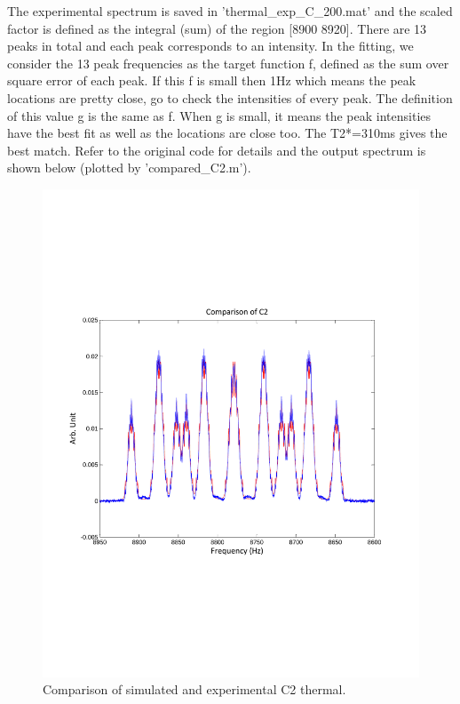 \documentclass[prl,onecolumn]{revtex4-1}
\begin{document}
The experimental spectrum is saved in 'thermal\_exp\_C\_200.mat' and the scaled factor is defined as the integral (sum) of the region [8900 8920]. There are 13 peaks in total and each peak corresponds to an intensity. In the fitting, we consider the 13 peak frequencies as the target function f, defined as the sum over square error of each peak. If this f is small then 1Hz which means the peak locations are pretty close, go to check the intensities of every peak. The definition of this value g is the same as f. When g is small, it means the peak intensities have the best fit as well as the locations are close too. The T2*=310ms gives the best match. Refer to the original code for details and the output spectrum is shown below (plotted by 'compared\_C2.m').

\begin{figure}
\begin{minipage}[hbtp]{0.5\linewidth}
\centering
\includegraphics[width=0.8\columnwidth]{comparison_C2.pdf}
\caption{Comparison of simulated and experimental C2 thermal.}
\label{fig:side:a}
\end{minipage}%
\begin{minipage}[hbtp]{0.5\linewidth}
\centering

\end{minipage}
\end{figure}
\end{document}
